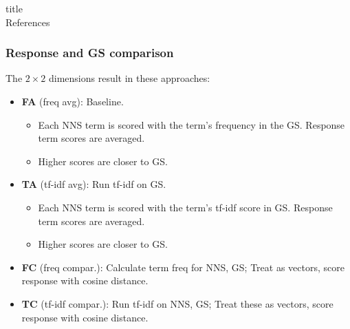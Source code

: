 \documentclass{beamer}
\begin{document}
%
\begin{beamercolorbox}{title}
\mbox{}\\[1ex]%
References
\end{beamercolorbox}
\medskip
\scriptsize



\begin{frame}[noframenumbering]
\frametitle{Response and GS comparison}
\vspace{-2em}
The $2 \times 2$ dimensions result in these approaches:
\smallskip
\begin{itemize}
\item \textbf{FA} (freq avg): Baseline. 
  \begin{itemize}
  \item Each NNS term is scored with the term's frequency in the
    GS. Response term scores are averaged. 
  \item Higher scores are closer to GS.
  \end{itemize}
\item \textbf{TA} (tf-idf avg): Run tf-idf on GS.
  \begin{itemize}
  \item Each NNS term is scored with the term's tf-idf score in GS.
    Response term scores are averaged.
  \item Higher scores are closer to GS.
  \end{itemize}
\item \textbf{FC} (freq compar.): Calculate term freq for NNS, GS; Treat as vectors, score response with cosine distance.
\smallskip
\item \textbf{TC} (tf-idf compar.): Run tf-idf on NNS, GS; Treat these as vectors, score response with cosine distance.
\end{itemize}
\end{frame}
\end{document}
